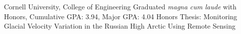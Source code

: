 
        {Cornell University, College of Engineering}{}
        {Graduated \textit{magna cum laude} with Honors, Cumulative GPA: 3.94, Major GPA: 4.04}
        {Honors Thesis: Monitoring Glacial Velocity Variation in the Russian High Arctic Using Remote Sensing}
